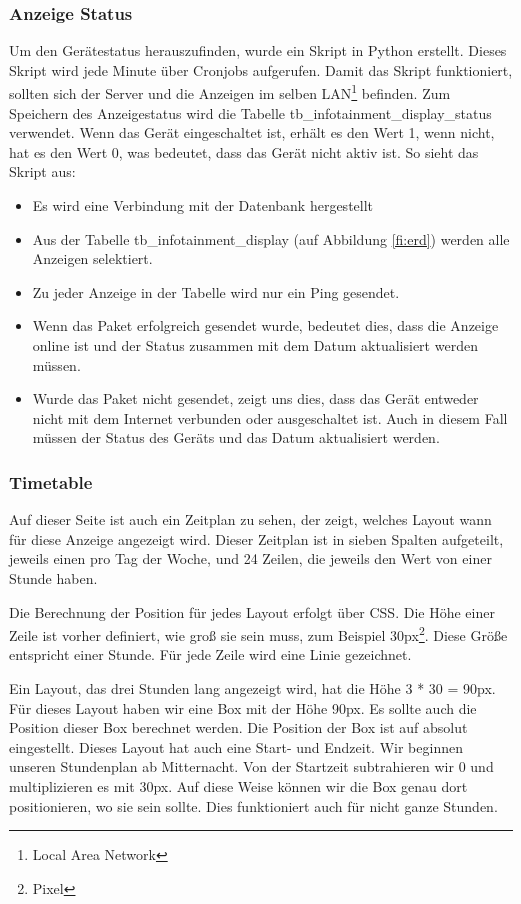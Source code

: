 \subsubsection{Anzeige Status}
Um den Gerätestatus herauszufinden, wurde ein Skript in Python erstellt. Dieses Skript wird jede Minute über Cronjobs aufgerufen. Damit das Skript funktioniert, sollten sich der Server und die Anzeigen im selben LAN\footnote{Local Area Network} befinden. Zum Speichern des Anzeigestatus wird die Tabelle tb\_infotainment\_display\_status verwendet. Wenn das Gerät eingeschaltet ist, erhält es den Wert 1, wenn nicht, hat es den Wert 0, was bedeutet, dass das Gerät nicht aktiv ist. So sieht das Skript aus:
\begin{itemize}
	\item Es wird eine Verbindung mit der Datenbank hergestellt
	\item Aus der Tabelle tb\_infotainment\_display (auf Abbildung \ref{fi:erd}) werden alle Anzeigen selektiert.
	\item Zu jeder Anzeige in der Tabelle wird nur ein Ping gesendet.
	\item Wenn das Paket erfolgreich gesendet wurde, bedeutet dies, dass die Anzeige online ist und der Status zusammen mit dem Datum aktualisiert werden müssen. 
	\item Wurde das Paket nicht gesendet, zeigt uns dies, dass das Gerät entweder nicht mit dem Internet verbunden oder ausgeschaltet ist. Auch in diesem Fall müssen der Status des Geräts und das Datum aktualisiert werden.
\end{itemize}


\subsubsection{Timetable}
Auf dieser Seite ist auch ein Zeitplan zu sehen, der zeigt, welches Layout wann für diese Anzeige angezeigt wird. Dieser Zeitplan ist in sieben Spalten aufgeteilt, jeweils einen pro Tag der Woche, und 24 Zeilen, die jeweils den Wert von einer Stunde haben.

Die Berechnung der Position für jedes Layout erfolgt über CSS. Die Höhe einer Zeile ist vorher definiert, wie groß sie sein muss, zum Beispiel 30px\footnote{Pixel}. Diese Größe entspricht einer Stunde. Für jede Zeile wird eine Linie gezeichnet. 

Ein Layout, das drei Stunden lang angezeigt wird, hat die Höhe 3 * 30 = 90px. Für dieses Layout haben wir eine Box mit der Höhe 90px. Es sollte auch die Position dieser Box berechnet werden. Die Position der Box ist auf absolut eingestellt. Dieses Layout hat auch eine Start- und Endzeit. Wir beginnen unseren Stundenplan ab Mitternacht. Von der Startzeit subtrahieren wir 0 und multiplizieren es mit 30px. Auf diese Weise können wir die Box genau dort positionieren, wo sie sein sollte. Dies funktioniert auch für nicht ganze Stunden.

